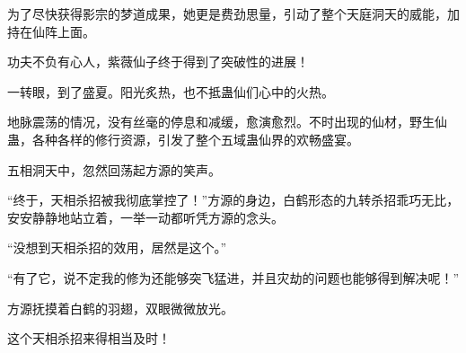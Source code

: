\begin{this_body}
为了尽快获得影宗的梦道成果，她更是费劲思量，引动了整个天庭洞天的威能，加持在仙阵上面。

功夫不负有心人，紫薇仙子终于得到了突破性的进展！

一转眼，到了盛夏。阳光炙热，也不抵蛊仙们心中的火热。

地脉震荡的情况，没有丝毫的停息和减缓，愈演愈烈。不时出现的仙材，野生仙蛊，各种各样的修行资源，引发了整个五域蛊仙界的欢畅盛宴。

五相洞天中，忽然回荡起方源的笑声。

“终于，天相杀招被我彻底掌控了！”方源的身边，白鹤形态的九转杀招乖巧无比，安安静静地站立着，一举一动都听凭方源的念头。

“没想到天相杀招的效用，居然是这个。”

“有了它，说不定我的修为还能够突飞猛进，并且灾劫的问题也能够得到解决呢！”

方源抚摸着白鹤的羽翅，双眼微微放光。

这个天相杀招来得相当及时！

\end{this_body}

